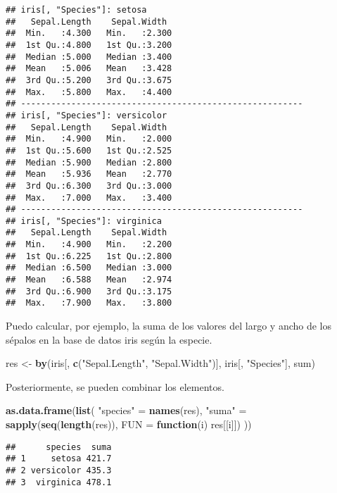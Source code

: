 \documentclass[]{article}
\newenvironment{Shaded}{\begin{snugshade}}{\end{snugshade}}
\newcommand{\KeywordTok}[1]{\textcolor[rgb]{0.13,0.29,0.53}{\textbf{#1}}}
\newcommand{\DataTypeTok}[1]{\textcolor[rgb]{0.13,0.29,0.53}{#1}}
\newcommand{\StringTok}[1]{\textcolor[rgb]{0.31,0.60,0.02}{#1}}
\newcommand{\ControlFlowTok}[1]{\textcolor[rgb]{0.13,0.29,0.53}{\textbf{#1}}}
\newcommand{\NormalTok}[1]{#1}
\begin{document}
\begin{verbatim}
## iris[, "Species"]: setosa
##   Sepal.Length    Sepal.Width   
##  Min.   :4.300   Min.   :2.300  
##  1st Qu.:4.800   1st Qu.:3.200  
##  Median :5.000   Median :3.400  
##  Mean   :5.006   Mean   :3.428  
##  3rd Qu.:5.200   3rd Qu.:3.675  
##  Max.   :5.800   Max.   :4.400  
## -------------------------------------------------------- 
## iris[, "Species"]: versicolor
##   Sepal.Length    Sepal.Width   
##  Min.   :4.900   Min.   :2.000  
##  1st Qu.:5.600   1st Qu.:2.525  
##  Median :5.900   Median :2.800  
##  Mean   :5.936   Mean   :2.770  
##  3rd Qu.:6.300   3rd Qu.:3.000  
##  Max.   :7.000   Max.   :3.400  
## -------------------------------------------------------- 
## iris[, "Species"]: virginica
##   Sepal.Length    Sepal.Width   
##  Min.   :4.900   Min.   :2.200  
##  1st Qu.:6.225   1st Qu.:2.800  
##  Median :6.500   Median :3.000  
##  Mean   :6.588   Mean   :2.974  
##  3rd Qu.:6.900   3rd Qu.:3.175  
##  Max.   :7.900   Max.   :3.800
\end{verbatim}

Puedo calcular, por ejemplo, la suma de los valores del largo y ancho de
los sépalos en la base de datos iris según la especie.

\begin{Shaded}
\begin{Highlighting}[]
\NormalTok{res <-}\StringTok{ }\KeywordTok{by}\NormalTok{(iris[, }\KeywordTok{c}\NormalTok{(}\StringTok{"Sepal.Length"}\NormalTok{, }\StringTok{"Sepal.Width"}\NormalTok{)], iris[, }\StringTok{"Species"}\NormalTok{], sum)}
\end{Highlighting}
\end{Shaded}

Posteriormente, se pueden combinar los elementos.

\begin{Shaded}
\begin{Highlighting}[]
\KeywordTok{as.data.frame}\NormalTok{(}\KeywordTok{list}\NormalTok{(}
  \StringTok{"species"}\NormalTok{ =}\StringTok{ }\KeywordTok{names}\NormalTok{(res), }
  \StringTok{"suma"}\NormalTok{ =}\StringTok{ }\KeywordTok{sapply}\NormalTok{(}\KeywordTok{seq}\NormalTok{(}\KeywordTok{length}\NormalTok{(res)), }\DataTypeTok{FUN =} \ControlFlowTok{function}\NormalTok{(i) res[[i]])}
\NormalTok{  ))}
\end{Highlighting}
\end{Shaded}

\begin{verbatim}
##      species  suma
## 1     setosa 421.7
## 2 versicolor 435.3
## 3  virginica 478.1
\end{verbatim}
\end{document}
